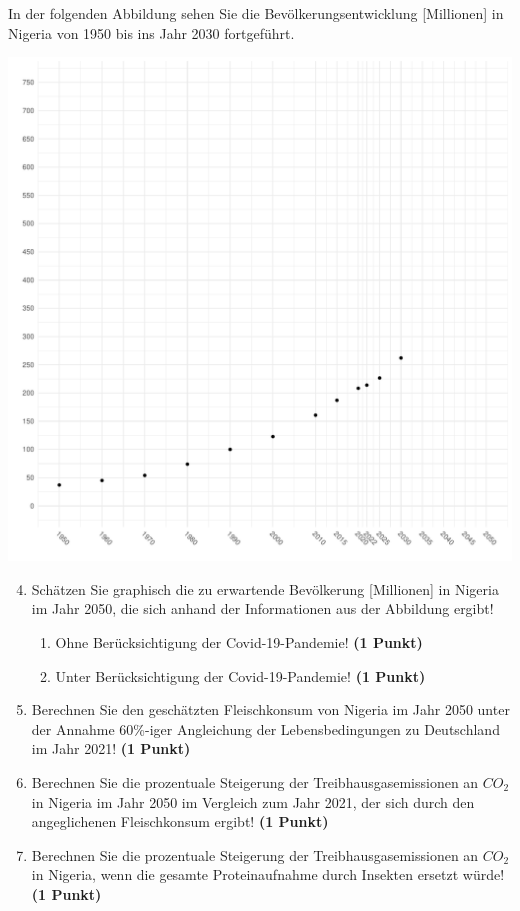 \documentclass[a4paper, 9pt]{scrartcl}\usepackage[]{graphicx}\usepackage[]{xcolor}
\makeatletter
\def\maxwidth{ %
  \ifdim\Gin@nat@width>\linewidth
    \linewidth
  \else
    \Gin@nat@width
  \fi
}
\newenvironment{knitrout}{}{} %
\makeatother
\begin{document}
\newpage

In der folgenden Abbildung sehen Sie die Bevölkerungsentwicklung [Millionen] in Nigeria von 1950 bis ins Jahr 2030 fortgeführt.

\begin{knitrout}
\color{fgcolor}

{\centering \includegraphics[width=\maxwidth]{img/math-14-c-1} 

}


\end{knitrout}

\begin{enumerate}
  \setcounter{enumi}{3}  
\item Schätzen Sie graphisch die zu erwartende Bevölkerung [Millionen] in Nigeria im Jahr 2050, die sich anhand der Informationen aus der Abbildung ergibt!
\begin{enumerate}
\item Ohne Berücksichtigung der Covid-19-Pandemie! \textbf{(1 Punkt)}
\item Unter Berücksichtigung der Covid-19-Pandemie! \textbf{(1 Punkt)}
\end{enumerate}
\item Berechnen Sie den geschätzten Fleischkonsum von Nigeria im Jahr 2050 unter der Annahme 60\%-iger Angleichung der Lebensbedingungen zu Deutschland im Jahr 2021! \textbf{(1 Punkt)}
\item Berechnen Sie die prozentuale Steigerung der Treibhausgasemissionen an $CO_2$ in Nigeria im Jahr 2050 im Vergleich zum Jahr 2021, der sich durch den angeglichenen Fleischkonsum ergibt! \textbf{(1 Punkt)}
\item Berechnen Sie die prozentuale Steigerung der Treibhausgasemissionen an $CO_2$ in Nigeria, wenn die gesamte Proteinaufnahme durch Insekten ersetzt würde! \textbf{(1 Punkt)}
\end{enumerate}
\end{document}
